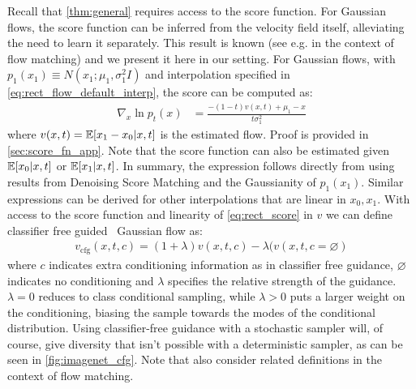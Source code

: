 Recall that \cref{thm:general} requires access to the score function.
For Gaussian flows, the score function can be inferred from the velocity field itself, alleviating the need to learn it separately.
This result is known (see e.g. \cite{zheng2023guided} in the context of flow matching) and we present it here in our setting.
For Gaussian flows, with $p_1(x_1) \equiv N(x_1; \mu_1, \sigma_1^2I)$ and interpolation specified in \cref{eq:rect_flow_default_interp}, the score can be computed as:
\begin{align}
\label{eq:rect_score}
\nabla_{x} \ln p_t(x) &= \frac{-(1-t)v(x, t)+\mu_1-x}{t\sigma_1^2}
\end{align}
where $v(x, t) = \mathbb{E} [x_1-x_0 | x, t]$ is the estimated flow.
Proof is provided in \cref{sec:score_fn_app}.
Note that the score function can also be estimated given $\mathbb{E} [x_0 | x, t]$ or $\mathbb{E} [x_1 | x, t]$.
In summary, the expression follows directly from using results from Denoising Score Matching \citep{vincent2011connection} and the Gaussianity of $p_1(x_1)$.
Similar expressions can be derived for other interpolations that are linear in $x_0, x_1$.
With access to the score function and linearity of \cref{eq:rect_score} in $v$ we can define classifier free guided~\citep{ho2022classifier} Gaussian flow as:
\begin{align}
v_{\text{cfg}}(x, t, c) = (1 + \lambda)v(x, t, c) - \lambda (v(x, t, c=\varnothing)
\end{align}
where $c$ indicates extra conditioning information as in classifier free guidance, $\varnothing$ indicates no conditioning and $\lambda$ specifies the relative strength of the guidance.
$\lambda = 0$ reduces to class conditional sampling, while $\lambda > 0$ puts a larger weight on the conditioning, biasing the sample towards the modes of the conditional distribution.
Using classifier-free guidance with a stochastic sampler will, of course, give diversity that isn't possible with a deterministic sampler, as can be seen in \cref{fig:imagenet_cfg}.
Note that \cite{xie2024reflected,dao2023flow,zheng2023guided} also consider related definitions in the context of flow matching.

